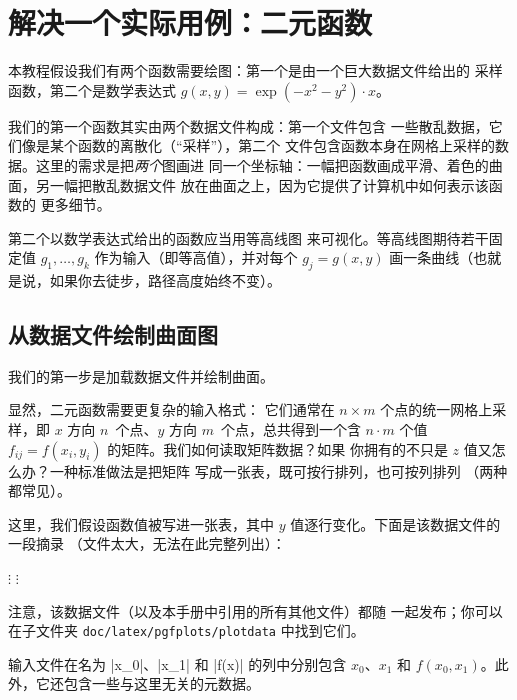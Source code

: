 \section{解决一个实际用例：二元函数}

本教程假设我们有两个函数需要绘图：第一个是由一个巨大数据文件给出的
采样函数，第二个是数学表达式 $g(x,y)=\exp(-x^2-y^2)\cdot x$。

我们的第一个函数其实由两个数据文件构成：第一个文件包含
一些散乱数据，它们像是某个函数的离散化（“采样”），第二个
文件包含函数本身在网格上采样的数据。这里的需求是把\emph{两个}图画进
同一个坐标轴：一幅把函数画成平滑、着色的曲面，另一幅把散乱数据文件
放在曲面之上，因为它提供了计算机中如何表示该函数的
更多细节。

第二个以数学表达式给出的函数应当用等高线图
来可视化。等高线图期待若干固定值 $g_1, \dotsc,
g_k$ 作为输入（即等高值），并对每个 $g_j = g(x,y)$
画一条曲线（也就是说，如果你去徒步，路径高度始终不变）。


\subsection{从数据文件绘制曲面图}

我们的第一步是加载数据文件并绘制曲面。

显然，二元函数需要更复杂的输入格式：
它们通常在 $n \times m$ 个点的统一网格上采样，即
$x$ 方向 $n$~个点、$y$ 方向 $m$~个点，总共得到一个含
$n\cdot m$ 个值 $f_{ij} = f(x_i,y_i)$ 的矩阵。我们如何读取矩阵数据？如果
你拥有的不只是 $z$ 值又怎么办？一种标准做法是把矩阵
写成一张表，既可按行排列，也可按列排列
（两种都常见）。

这里，我们假设函数值被写进一张表，其中
$y$ 值逐行变化。下面是该数据文件的一段摘录
（文件太大，无法在此完整列出）：

        \baselineskip
            $\vdots$
        \baselineskip
        \baselineskip
            $\vdots$

注意，该数据文件（以及本手册中引用的所有其他文件）都随
\PGFPlots{} 一起发布；你可以在子文件夹
\texttt{doc/latex/pgfplots/plotdata} 中找到它们。

输入文件在名为 |x_0|、|x_1| 和 |f(x)| 的列中分别包含 $x_0$、$x_1$
和 $f(x_0,x_1)$。此外，它还包含一些与这里无关的元数据。

